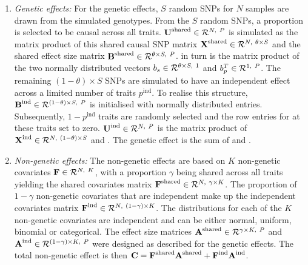 %
\begin{enumerate}
\item \textit{Genetic effects:} For the genetic effects, \(S\) random SNPs for \(N\) samples are drawn from the simulated genotypes. From the \(S\) random SNPs, a proportion \tmat{\theta} is selected to be causal across all traits. \(\boldsymbol{\mathbf{U}}^\text{shared}\in \mathcal{R}^{N,~P}\) is simulated as the matrix product of this shared causal SNP matrix \(\boldsymbol{\mathbf{X}}^\text{shared}\in \mathcal{R}^{N,~\theta \times S}\) and the shared effect size matrix \(\boldsymbol{\mathbf{B}}^\text{shared} \in \mathcal{R}^{\theta  \times S,~P}\).  in turn is the matrix product of the two normally distributed vectors \(b_s \in \mathcal{R}^{\theta  \times S,~1}\) and \(b_p^T \in \mathcal{R}^{1,~P}\). The remaining \((1- \theta ) \times S\) SNPs are simulated to have an independent effect across a limited number of traits \(p^{\text{ind}}\). To realise this structure, \(\boldsymbol{\mathbf{B}}^\text{ind} \in \mathcal{R}^{(1-\theta) \times S,~P}\) is initialised with normally distributed entries. Subsequently, \(1 - p^{\text{ind}}\) traits are randomly selected and the row entries for  at these traits set to zero. \(\boldsymbol{\mathbf{U}}^\text{ind} \in \mathcal{R}^{N,~P}\) is the matrix product of \(\boldsymbol{\mathbf{X}}^\text{ind} \in \mathcal{R}^{N,~(1 - \theta)  \times S}\) and .
The genetic effect  is the sum of  and .

\item \textit{Non-genetic effects:} The non-genetic effects  are based on \(K\) non-genetic covariates \(\boldsymbol{\mathbf{F}} \in \mathcal{R}^{N,~K}\), with a proportion \(\gamma\) being shared across all traits yielding the shared covariates matrix \(\boldsymbol{\mathbf{F}}^\text{shared} \in \mathcal{R}^{N,~\gamma \times K} \). The proportion of \(1- \gamma\) non-genetic covariates that are independent make up the independent covariates matrix \(\boldsymbol{\mathbf{F}}^\text{ind} \in \mathcal{R}^{N,~(1-\gamma) \times K}\). The distributions for each of the \(K\)  non-genetic covariates are independent and can be either normal, uniform, binomial or categorical.  The effect size matrices  \(\boldsymbol{\mathbf{A}}^\text{shared} \in \mathcal{R}^{\gamma \times K,~P}\)  and \(\boldsymbol{\mathbf{A}}^\text{ind}  \in \mathcal{R}^{(1-\gamma) \times K,~P} \) were designed as described for the genetic effects. The total non-genetic effect is then \(\boldsymbol{\mathbf{C}} =  \boldsymbol{\mathbf{F}}^\text{shared} \boldsymbol{\mathbf{A}}^\text{shared} + \boldsymbol{\mathbf{F}}^\text{ind}  \boldsymbol{\mathbf{A}}^\text{ind} \).


\end{enumerate}
